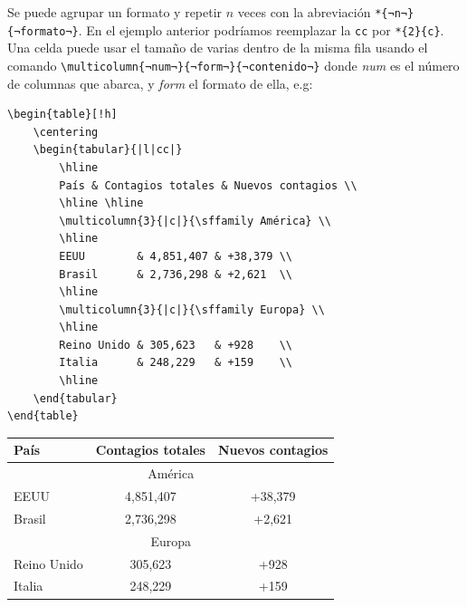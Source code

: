 Se puede agrupar un formato y repetir $n$ veces con la abreviación \lstinline|*{¬n¬}{¬formato¬}|. En el ejemplo anterior podríamos reemplazar la \lstinline|cc| por \lstinline|*{2}{c}|. Una celda puede usar el tamaño de varias dentro de la misma fila usando el comando \lstinline|\multicolumn{¬num¬}{¬form¬}{¬contenido¬}| donde \textit{num} es el número de columnas que abarca, y \textit{form} el formato de ella, e.g:
\begin{lstlisting}[basicstyle=\footnotesize\ttfamily]
\begin{table}[!h]
	\centering
	\begin{tabular}{|l|cc|}
		\hline
		País & Contagios totales & Nuevos contagios \\
		\hline \hline
		\multicolumn{3}{|c|}{\sffamily América} \\
		\hline
		EEUU        & 4,851,407 & +38,379 \\
		Brasil      & 2,736,298 & +2,621  \\
		\hline
		\multicolumn{3}{|c|}{\sffamily Europa} \\
		\hline
		Reino Unido & 305,623   & +928    \\
		Italia      & 248,229   & +159    \\
		\hline
	\end{tabular}
\end{table}
\end{lstlisting}
\begin{table}[!h]
	\centering
	\begin{tabular}{|l|cc|}
		\hline
		País & Contagios totales & Nuevos contagios \\
		\hline \hline
		\multicolumn{3}{|c|}{\sffamily América} \\
		\hline
		EEUU        & 4,851,407 & +38,379 \\
		Brasil      & 2,736,298 & +2,621  \\
		\hline
		\multicolumn{3}{|c|}{\sffamily Europa} \\
		\hline
		Reino Unido & 305,623   & +928    \\
		Italia      & 248,229   & +159    \\
		\hline
	\end{tabular}
\end{table}

